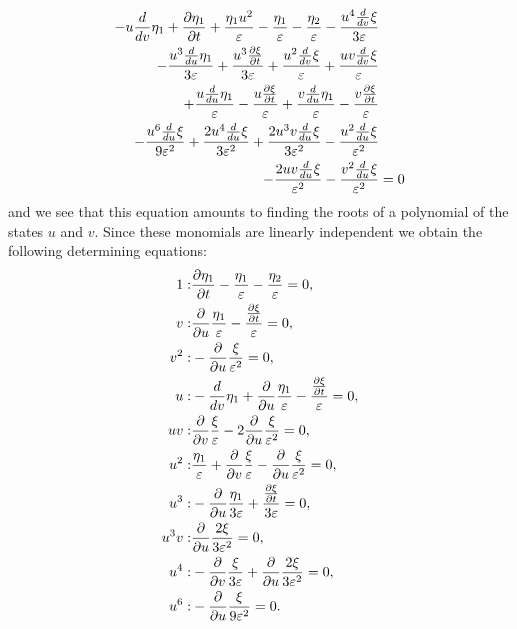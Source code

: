 \begin{align}
  - u \frac{d}{d v} \eta_1 + \pdv{\eta_1}{t} + \frac{\eta_1 u^{2}}{\varepsilon} - \frac{\eta_1}{\varepsilon} - \frac{\eta_2}{\varepsilon} - \frac{u^{4} \frac{d}{d v} \xi}{3 \varepsilon}&\nonumber\\
  - \frac{u^{3} \frac{d}{d u} \eta_1}{3 \varepsilon} + \frac{u^{3} \pdv{\xi}{t}}{3 \varepsilon} + \frac{u^{2} \frac{d}{d v} \xi}{\varepsilon} + \frac{u v \frac{d}{d v} \xi}{\varepsilon}&\nonumber\\
  + \frac{u \frac{d}{d u} \eta_1}{\varepsilon} - \frac{u \pdv{\xi}{t}}{\varepsilon} + \frac{v \frac{d}{d u} \eta_1}{\varepsilon} - \frac{v\pdv{\xi}{t}}{\varepsilon}&\nonumber\\
  - \frac{u^{6} \frac{d}{d u} \xi}{9 \varepsilon^{2}} + \frac{2 u^{4} \frac{d}{d u} \xi}{3 \varepsilon^{2}} + \frac{2 u^{3} v \frac{d}{d u} \xi}{3 \varepsilon^{2}} - \frac{u^{2} \frac{d}{d u} \xi}{\varepsilon^{2}}&\nonumber\\
  - \frac{2 u v \frac{d}{d u} \xi}{\varepsilon^{2}} - \frac{v^{2} \frac{d}{d u} \xi}{\varepsilon^{2}}&=0\label{eq:BZ_lin_sym_1}
\end{align}
and we see that this equation amounts to finding the roots of a polynomial of the states $u$ and $v$. Since these monomials are linearly independent we obtain the following determining equations:
\begin{align}
  1:&\pdv{\eta_1}{t} - \frac{\eta_1}{\varepsilon} - \frac{\eta_2}{\varepsilon}=0,\\
  v:&\pdv{}{u} \frac{\eta_1}{\varepsilon} - \frac{\pdv{\xi}{t}}{\varepsilon}=0,\\
  v^{2}:&- \pdv{}{u} \frac{\xi}{\varepsilon^{2}}=0,\\
  u:&- \frac{d}{d v} \eta_1 + \pdv{}{u} \frac{\eta_1}{\varepsilon} - \frac{\pdv{\xi}{t}}{\varepsilon}=0,\\  
  u v:&\pdv{}{v} \frac{\xi}{\varepsilon} - 2 \pdv{}{u} \frac{\xi}{\varepsilon^{2}}=0,\\
  u^{2}:&\frac{\eta_1}{\varepsilon} + \pdv{}{v} \frac{\xi}{\varepsilon} - \pdv{}{u} \frac{\xi}{\varepsilon^{2}}=0,\\
  u^{3}:&- \pdv{}{u} \frac{\eta_1}{3 \varepsilon} + \frac{\pdv{\xi}{t}}{3 \varepsilon}=0,\\
u^{3} v:&\pdv{}{u}\frac{2  \xi}{3 \varepsilon^{2}}=0,\\
 u^{4}:&- \pdv{}{v}\frac{\xi}{3 \varepsilon} + \pdv{}{u}\frac{2 \xi}{3 \varepsilon^{2}}=0,\\
 u^{6}:&- \pdv{}{u} \frac{\xi}{9 \varepsilon^{2}}=0.\\
\end{align}

